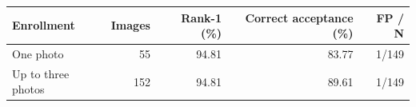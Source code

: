 \begin{tabular}{lrrrr}
\hline
Enrollment & Images & Rank-1 (\%) & Correct acceptance (\%) & FP / N \\
\hline
One photo & 55 & 94.81 & 83.77 & 1/149 \\
Up to three photos & 152 & 94.81 & 89.61 & 1/149 \\
\hline
\end{tabular}
